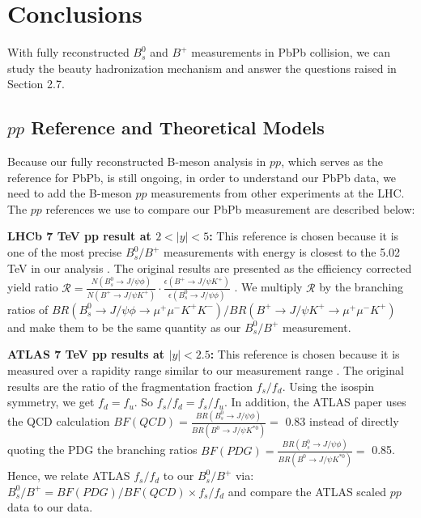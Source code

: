 \chapter{Conclusions}

With fully reconstructed $B^0_s$ and $B^+$ measurements in PbPb collision, we can study the beauty hadronization mechanism and answer the questions raised in Section 2.7.

\section{$pp$ Reference and Theoretical Models}

Because our fully reconstructed B-meson analysis in $pp$, which serves as the reference for PbPb, is still ongoing, in order to understand our PbPb data, we need to add the B-meson $pp$ measurements from other experiments at the LHC. The $pp$ references we use to compare our PbPb measurement are described below:

\textbf{LHCb 7 TeV pp result at $2 < |y| < 5$:} This reference is chosen because it is one of the most precise $B^0_s/B^+$ measurements with energy is closest to the 5.02 TeV in our analysis \cite{LHCbFF} . The original results are presented as the efficiency corrected yield ratio $\mathcal{R} = \frac{N(B^0_s \rightarrow J/\psi \phi)}{N(B^+ \rightarrow J/\psi K^+)} \cdot \frac{\epsilon(B^+ \rightarrow J/\psi K^+)}{\epsilon(B^0_s \rightarrow J/\psi \phi)}$ \cite{LHCbFF}. We multiply $\mathcal{R}$ by the branching ratios of $BR(B^0_s \rightarrow J/\psi \phi \rightarrow \mu^+\mu^- K^+ K^-)/BR(B^+ \rightarrow J/\psi K^+ \rightarrow \mu^+\mu^- K^+)$ and make them to be the same quantity as our $B^0_s/B^+$ measurement.

\textbf{ATLAS 7 TeV pp results at $|y| < 2.5$:} This reference is chosen because it is measured over a rapidity range similar to our measurement range \cite{ATLASPPRef} . The original results are the ratio of the fragmentation fraction $f_s/f_d$. Using the isospin symmetry, we get $f_d = f_u$. So $f_s/f_d = f_s/f_u$. In addition, the ATLAS paper uses the QCD calculation $BF(QCD) = \frac{BR(B^0_s \rightarrow J/\psi \phi)}{BR(B^0 \rightarrow J/\psi K^{*0})} =$ 0.83 instead of directly quoting the PDG the branching ratios $BF(PDG) = \frac{BR(B^0_s \rightarrow J/\psi \phi)}{BR(B^0 \rightarrow J/\psi K^{*0})} =$ 0.85. Hence, we relate ATLAS $f_s/f_d$ to our $B^0_s/B^+$ via: $B^0_s/B^+ = BF(PDG)/BF(QCD) \times f_s/f_d$ and compare the ATLAS scaled $pp$ data to our data.


